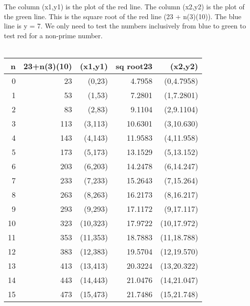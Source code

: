 \documentclass[12pt,letterpaper,oneside,titlepage]{article}
\begin{document}
\par
\tab The column (x1,y1) is the plot of the red line. The column (x2,y2) is the plot of the green line. This is the square root of the red line (23 + n(3)(10)). The blue line is y = 7. We only need to test the numbers inclusively from blue to green to test red for a non-prime number.  
\\
\\
\begin{tabular}{|r|r|r|r|r|}
\hline    n     & 23+n(3)(10)  &   (x1,y1)      &   sq root23     &  (x2,y2)       \\
\hline    0     & 23           &   (0,23)       &   4.7958        &  (0,4.7958)    \\
\hline    1     & 53           &   (1,53)       &   7.2801        &  (1,7.2801)    \\
\hline    2     & 83           &   (2,83)       &   9.1104        &  (2,9.1104)    \\
\hline    3     & 113          &   (3,113)      &   10.6301       &  (3,10.630)    \\
\hline    4     & 143          &   (4,143)      &   11.9583       &  (4,11.958)    \\
\hline    5     & 173          &   (5,173)      &   13.1529       &  (5,13.152)    \\
\hline    6     & 203          &   (6,203)      &   14.2478       &  (6,14.247)    \\
\hline    7     & 233          &   (7,233)      &   15.2643       &  (7,15.264)    \\
\hline    8     & 263          &   (8,263)      &   16.2173       &  (8,16.217)    \\
\hline    9     & 293          &   (9,293)      &   17.1172       &  (9,17.117)    \\
\hline    10    & 323          &   (10,323)     &   17.9722       &  (10,17.972)   \\
\hline    11    & 353          &   (11,353)     &   18.7883       &  (11,18.788)   \\
\hline    12    & 383          &   (12,383)     &   19.5704       &  (12,19.570)   \\
\hline    13    & 413          &   (13,413)     &   20.3224       &  (13,20.322)   \\
\hline    14    & 443          &   (14,443)     &   21.0476       &  (14,21.047)   \\
\hline    15    & 473          &   (15,473)     &   21.7486       &  (15,21.748)   \\

\end{tabular}
\end{document}
